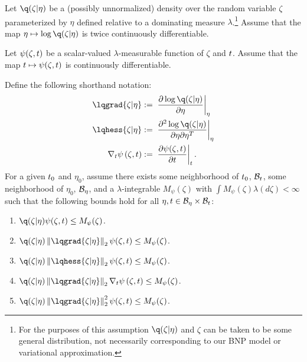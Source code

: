 \begin{assu}
%
Let $\q(\zeta \vert \eta)$ be a (possibly unnormalized) density over the random
variable $\zeta$ parameterized by $\eta$ defined relative to a dominating
measure $\lambda$.\footnote{For the purposes of this assumption  $\q(\zeta \vert
\eta)$ and $\zeta$ can be taken to be some general distribution, not necessarily
corresponding to our BNP model or variational approximation.} Assume that the
map $\eta \mapsto \log \q(\zeta \vert \eta)$ is twice continuously
differentiable.

Let $\psi(\zeta, t)$ be a scalar-valued $\lambda$-measurable function of
$\zeta$ and $t$.  Assume that the map $t \mapsto \psi(\zeta, t)$ is
continuously differentiable.

Define the following shorthand notation:
%
\begin{align*}
%
\lqgrad{\zeta \vert \eta} :={}&
    \fracat{\partial \log \q(\zeta \vert \eta)}{\partial \eta}{\eta} \\
%
\lqhess{\zeta \vert \eta} :={}&
    \fracat{\partial^2 \log \q(\zeta \vert \eta)}
           {\partial \eta \partial \eta^T}{\eta} \\
%
\psigrad{\zeta, \t} :={}& \fracat{\partial \psi(\zeta, \t)}{\partial \t}{\t}.
%
\end{align*}
%
For a given $t_0$ and $\eta_0$, assume there exists some neighborhood of
$t_0$, $\mathcal{B}_t$, some neighborhood of $\eta_0$, $\mathcal{B}_\eta$, and a
$\lambda$-integrable $M_\psi(\zeta)$ with $\int M_\psi(\zeta) \lambda(d\zeta) <
\infty$ such that the following bounds hold for all $\eta, t \in \mathcal{B}_\eta
\times \mathcal{B}_t$:
%
\begin{enumerate}
%
\item {}
$\q(\zeta \vert \eta) \psi(\zeta, \t) \le M_\psi(\zeta)$.
%
\item {}
$\q(\zeta \vert \eta) \norm{\lqgrad{\zeta \vert \eta}}_2 \psi(\zeta, \t) \le
M_\psi(\zeta)$.
%
\item {}
$\q(\zeta \vert \eta) \norm{\lqhess{\zeta \vert \eta}}_2 \psi(\zeta, \t) \le
M_\psi(\zeta)$.
%
\item {}
$\q(\zeta \vert \eta) \norm{\lqgrad{\zeta \vert \eta}}_2 \psigrad{\zeta, \t}
\le M_\psi(\zeta)$.
%
\item {}
$\q(\zeta \vert \eta) \norm{\lqgrad{\zeta \vert \eta}}^2_2 \psi(\zeta, \t) \le
M_\psi(\zeta)$.
%
\end{enumerate}
%
\end{assu}


